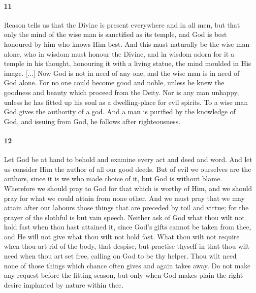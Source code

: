 \documentclass[12pt]{article}
\begin{document}
\paragraph{11} Reason tells us that the Divine is present everywhere and in all men, but that only the mind of the wise man is sanctified as its temple, and God is best honoured by him who knows Him best. And this must naturally be the wise man alone, who in wisdom must honour the Divine, and in wisdom adorn for it a temple in his thought, honouring it with a living statue, the mind moulded in His image. [...] Now God is not in need of any one, and the wise man is in need of God alone. For no one could become good and noble, unless he knew the goodness and beauty which proceed from the Deity. Nor is any man unhappy, unless he has fitted up his soul as a dwelling-place for evil spirits. To a wise man God gives the authority of a god. And a man is purified by the knowledge of God, and issuing from God, he follows after righteousness.

\paragraph{12} Let God be at hand to behold and examine every act and deed and word. And let us consider Him the author of all our good deeds. But of evil we ourselves are the authors, since it is we who made choice of it, but God is without blame. Wherefore we should pray to God for that which is worthy of Him, and we should pray for what we could attain from none other. And we must pray that we may attain after our labours those things that are preceded by toil and virtue; for the prayer of the slothful is but vain speech. Neither ask of God what thou wilt not hold fast when thou hast attained it, since God's gifts cannot be taken from thee, and He will not give what thou wilt not hold fast. What thou wilt not require when thou art rid of the body, that despise, but practise thyself in that thou wilt need when thou art set free, calling on God to be thy helper. Thou wilt need none of those things which chance often gives and again takes away. Do not make any request before the fitting season, but only when God makes plain the right desire implanted by nature within thee.
\end{document}
